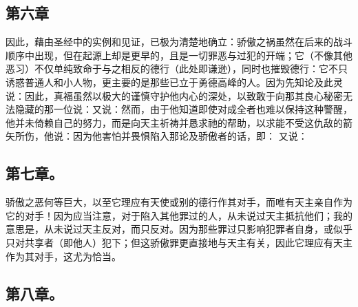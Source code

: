 
\subsection{第六章}

\par

因此，藉由圣经中的实例和见证，已极为清楚地确立：骄傲之祸虽然在后来的战斗顺序中出现，但在起源上却是更早的，且是一切罪恶与过犯的开端；它（不像其他恶习）不仅单纯致命于与之相反的德行（此处即谦逊），同时也摧毁德行：它不只诱惑普通人和小人物，更主要的是那些已立于勇德高峰的人。因为先知论及此灵说：因此，真福虽然以极大的谨慎守护他内心的深处，以致敢于向那其良心秘密无法隐藏的那一位说：又说：然而，由于他知道即使对成全者也难以保持这种警醒，他并未倚赖自己的努力，而是向天主祈祷并恳求祂的帮助，以求能不受这仇敌的箭矢所伤，他说：因为他害怕并畏惧陷入那论及骄傲者的话，即： 又说：\par


\subsection{第七章。}

\par

骄傲之恶何等巨大，以至它理应有天使或别的德行作其对手，而唯有天主亲自作为它的对手！因为应当注意，对于陷入其他罪过的人，从未说过天主抵抗他们；我的意思是，从未说过天主反对，而只反对。因为那些罪过只影响犯罪者自身，或似乎只对共享者（即他人）犯下；但这骄傲罪更直接地与天主有关，因此它理应有天主作为其对手，这尤为恰当。\par


\subsection{第八章。}

